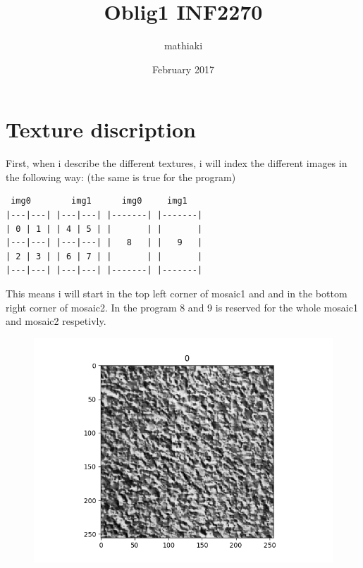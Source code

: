 \documentclass{article}
\title{Oblig1 INF2270}
\author{mathiaki}
\date{February 2017}
\begin{document}
\maketitle

\newpage
\tableofcontents
\newpage

\section{Texture discription}
First, when i describe the different textures, i will index the different images in the following way: (the same is true for the program)\\
\begin{verbatim}
 img0        img1      img0     img1
|---|---| |---|---| |-------| |-------|
| 0 | 1 | | 4 | 5 | |       | |       |
|---|---| |---|---| |   8   | |   9   |
| 2 | 3 | | 6 | 7 | |       | |       |
|---|---| |---|---| |-------| |-------|

\end{verbatim}

This means i will start in the top left corner of mosaic1 and and in the bottom right corner of mosaic2. In the program 8 and 9 is reserved for the whole mosaic1 and mosaic2 respetivly. 

\begin{figure}
\includegraphics[scale=1]{0.png}
\end{figure}
\end{document}
